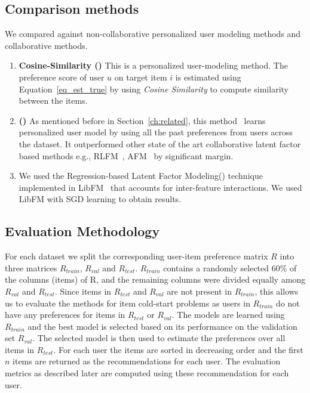 

\subsection{Comparison methods} \label{other_methods}
We compared \CF against non-collaborative personalized user modeling methods and
collaborative methods.

\begin{enumerate}
  \item \textbf{Cosine-Similarity (\COSIM)}
       This is a personalized user-modeling method.
        The preference score of user $u$ on target item $i$ is estimated using
        Equation~\ref{eq_est_true} by using \emph{Cosine Similarity} to compute
        similarity between the items.
  \item{\textbf{\CFLINEXP (\CFLIN)}}
        As mentioned before in Section~\ref{ch:related}, this method~\cite{elbadrawy2015} learns personalized user model
        by using all the past preferences from users across the dataset. It
        outperformed other state of the art collaborative latent factor based methods e.g.,
        RLFM~\cite{agarwal09},  AFM~\cite{gantner10} by significant margin.
  \item{\textbf{\RLFMI}}
        We used the Regression-based Latent Factor Modeling(\RLFM) technique
        implemented in LibFM~\cite{rendle12libfm} that accounts for inter-feature interactions. We
        used LibFM with SGD learning to obtain results.
\end{enumerate}




\subsection{Evaluation Methodology}
For each dataset we split the corresponding user-item preference matrix  $R$ into three
matrices $R_{train}$, $R_{val}$ and $R_{test}$. $R_{train}$ contains a randomly
selected $60\%$ of the columns (items) of R, and the remaining columns were divided equally
among $R_{val}$ and $R_{test}$. Since items in $R_{test}$ and $R_{val}$ are not
present in $R_{train}$, this allows us to evaluate the methods for item cold-start
problems as users in $R_{train}$ do not have any preferences for items in
$R_{test}$ or $R_{val}$. 
The models are learned using $R_{train}$ and the best model is
selected based on its performance on the validation set $R_{val}$. The selected model
is then used to estimate the preferences over all items in $R_{test}$. For each
user the items are sorted in decreasing order and the first $n$ items are returned
as the \TOPN recommendations for each user. The evaluation metrics as described
later are computed using these \TOPN recommendation for each user. 

